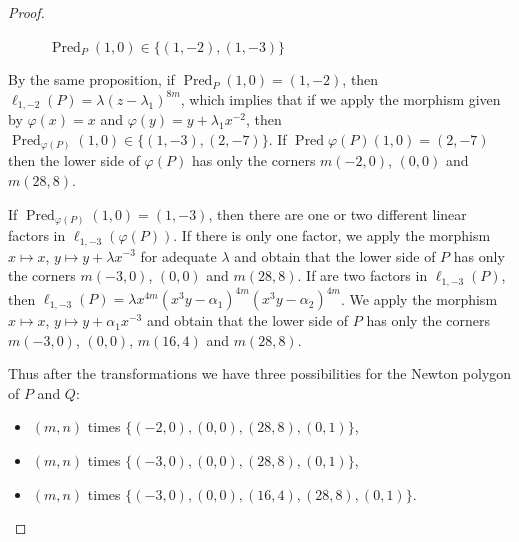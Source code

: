 \documentclass[reqno,a4paper,twoside]{amsart}
\theoremstyle{definition}
\theoremstyle{remark}
\DeclareMathOperator{\Pred}{Pred}
\begin{document}
\begin{proof}
\begin{figure}[htb]
\caption{$\Pred_P(1,0)\in\{(1,-2),(1,-3)\}$}
\end{figure}

By the same proposition, if $\Pred_P(1,0)=(1,-2)$, then $\ell_{1,-2}(P)=\lambda (z-\lambda_1)^{8m}$, which implies that
if we apply the morphism given by $\varphi(x)=x$ and  $\varphi(y)=y+\lambda_1 x^{-2}$, then $\Pred_{\varphi(P)}(1,0)\in \{(1,-3),(2,-7)\}$. If
$\Pred{\varphi(P)}(1,0)=(2,-7)$ then the lower side of $\varphi(P)$ has only the corners $m(-2,0)$, $(0,0)$ and $m(28,8)$.

If $\Pred_{\varphi(P)}(1,0)=(1,-3)$, then there are one or two different linear factors in $\ell_{1,-3}(\varphi(P))$.
If there is only one factor, we apply the morphism
 $x\mapsto x$, $y\mapsto y+\lambda x^{-3}$ for adequate $\lambda$ and obtain that the lower side of $P$ has
only the corners $m(-3,0)$, $(0,0)$ and $m(28,8)$.
If are two factors  in $\ell_{1,-3}(P)$, then $\ell_{1,-3}(P)=\lambda x^{4m}(x^3y-\alpha_1)^{4m}(x^3y-\alpha_2)^{4m}$. We apply the morphism
 $x\mapsto x$, $y\mapsto y+\alpha_1 x^{-3}$ and obtain that the lower side of $P$ has
only the corners $m(-3,0)$, $(0,0)$, $m(16,4)$ and $m(28,8)$.

Thus after the transformations we have three possibilities for the Newton polygon of $P$ and $Q$:
\begin{itemize}
  \item[a)] $(m,n)$ times $\{(-2,0),(0,0),(28,8),(0,1)\}$,
  \item[b)] $(m,n)$ times $\{(-3,0),(0,0),(28,8),(0,1)\}$,
  \item[c)] $(m,n)$ times $\{(-3,0),(0,0),(16,4),(28,8),(0,1)\}$.
\end{itemize}


\end{proof}
\end{document}
